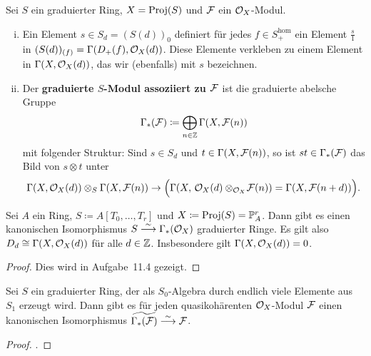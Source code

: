 \begin{defn}
\label{defn:11.13}
	Sei $S$ ein graduierter Ring, $X=\operatorname{Proj}(S)$ und $\mathcal{F}$ ein $\mathcal{O}_X$-Modul.
	\begin{enumerate}[i)]
		\item Ein Element $s \in S_d=(S(d))_0$ definiert für jedes $f \in S_+^\text{hom}$ ein Element $\frac{s}{1}$ in $(S(d))_{(f)} = \Gamma(D_+(f),\mathcal{O}_X(d))$. Diese Elemente verkleben zu einem Element in $\Gamma(X,\mathcal{O}_X(d))$, das wir (ebenfalls) mit $s$ bezeichnen.
		\item Der \textbf{graduierte $S$-Modul assoziiert zu $\mathcal{F}$} ist die graduierte abelsche Gruppe
			\[ \Gamma_*(\mathcal{F})\coloneqq \bigoplus_{n\in \mathbb {Z}}\Gamma(X,\mathcal{F}(n)) \]
			mit folgender Struktur: Sind $s \in S_d$ und $t \in \Gamma(X,\mathcal{F}(n))$, so ist $st \in \Gamma_*(\mathcal{F})$ das Bild von $s \otimes t$ unter
		\[
		 	\Gamma(X,\mathcal{O}_X(d))\otimes_S \Gamma(X,\mathcal{F}(n)) \to \Bigl(\Gamma(X,\,\mathcal{O}_X(d)\otimes_{\mathcal{O}_X}\!\mathcal{F}(n)) = \Gamma(X,\mathcal{F}(n+d))\Bigr).
		\] 
	\end{enumerate}
\end{defn}

\begin{prop}
\label{prop:11.14}
	Sei $A$ ein Ring, $S \coloneqq A[T_0,\ldots,T_r]$ und $X\coloneqq \operatorname{Proj}(S) = \mathbb {P}^r_A$. Dann gibt es einen kanonischen Isomorphismus $S \overset{\sim}{\longrightarrow} \Gamma_*(\mathcal{O}_X)$ graduierter Ringe. Es gilt also $D_d \cong \Gamma(X,\mathcal{O}_X(d))$ für alle $d \in \mathbb {Z}$. Insbesondere gilt $\Gamma(X,\mathcal{O}_X(d)) = 0$.
	\begin{proof}
	 	Dies wird in Aufgabe~11.4 gezeigt.
	 \end{proof} 
\end{prop}

\begin{prop}
\label{prop:11.15}
	Sei $S$ ein graduierter Ring, der als $S_0$-Algebra durch endlich viele Elemente aus $S_1$ erzeugt wird. Dann gibt es für jeden quasikohärenten $\mathcal{O}_X$-Modul $\mathcal{F}$ einen kanonischen Isomorphismus $\widetilde{\Gamma_*(\mathcal{F})}\overset{\sim}{\longrightarrow} \mathcal{F}$.
	\begin{proof}
		\cite[Proposition~II.5.15]{hartshorne1977algebraic}.
	\end{proof}
\end{prop}

